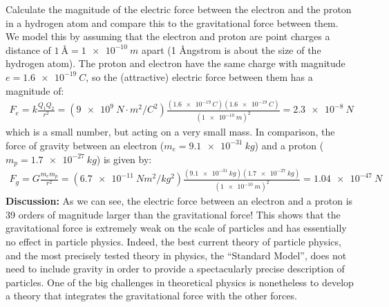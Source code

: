 \begin{example}{Calculate the magnitude of the electric force between the electron and the proton in a hydrogen atom and compare this to the gravitational force between them.}
We model this by assuming that the electron and proton are point charges a distance of $\SI{1}{\angstrom}=\SI{1e-10}{m}$ apart (1 \r Angstrom is about the size of the hydrogen atom). The proton and electron have the same charge with magnitude $e=\SI{1.6e-19}{C}$, so the (attractive) electric force between them has a magnitude of:
\begin{align*}
F_e = k\frac{Q_1Q_2}{r^2}=(\SI{9e9}{N\cdot m^2/C^{2}})\frac{(\SI{1.6e-19}{C})(\SI{1.6e-19}{C})}{(\SI{1e-10}{m})^2}=\SI{2.3e-8}{N}
\end{align*}
which is a small number, but acting on a very small mass. In comparison, the force of gravity between an electron ($m_e=\SI{9.1e-31}{kg}$) and a proton ($m_p=\SI{1.7e-27}{kg}$) is given by:
\begin{align*}
F_g=G\frac{m_em_p}{r^2}=(\SI{6.7e-11}{Nm^2/kg^2})\frac{(\SI{9.1e-31}{kg})(\SI{1.7e-27}{kg})}{(\SI{1e-10}{m})^2}=\SI{1.04e-47}{N}
\end{align*}
\textbf{Discussion:} As we can see, the electric force between an electron and a proton is 39 orders of magnitude larger than the gravitational force! This shows that the gravitational force is extremely weak on the scale of particles and has essentially no effect in particle physics. Indeed, the best current theory of particle physics, and the most precisely tested theory in physics, the ``Standard Model'', does not need to include gravity in order to provide a spectacularly precise description of particles. One of the big challenges in theoretical physics is nonetheless to develop a theory that integrates the gravitational force with the other forces.
\end{example}
